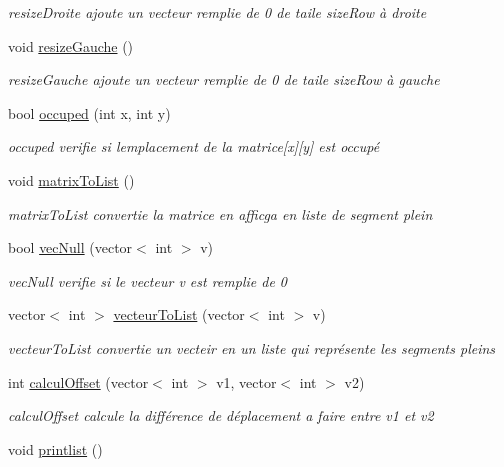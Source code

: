 \begin{DoxyCompactItemize}
\begin{DoxyCompactList}\small\item\em resize\+Droite ajoute un vecteur remplie de 0 de taile size\+Row à droite \end{DoxyCompactList}\item 
void \hyperlink{classmatrix_a20b826143f701edefd8eacb92e44c7a6}{resize\+Gauche} ()\hypertarget{classmatrix_a20b826143f701edefd8eacb92e44c7a6}{}\label{classmatrix_a20b826143f701edefd8eacb92e44c7a6}

\begin{DoxyCompactList}\small\item\em resize\+Gauche ajoute un vecteur remplie de 0 de taile size\+Row à gauche \end{DoxyCompactList}\item 
bool \hyperlink{classmatrix_ab803b319d6488ae03985740b6437222f}{occuped} (int x, int y)
\begin{DoxyCompactList}\small\item\em occuped verifie si l\textquotesingle{}emplacement de la matrice\mbox{[}x\mbox{]}\mbox{[}y\mbox{]} est occupé \end{DoxyCompactList}\item 
void \hyperlink{classmatrix_a041925ba18b2fb25d350d0f6786d8a2a}{matrix\+To\+List} ()\hypertarget{classmatrix_a041925ba18b2fb25d350d0f6786d8a2a}{}\label{classmatrix_a041925ba18b2fb25d350d0f6786d8a2a}

\begin{DoxyCompactList}\small\item\em matrix\+To\+List convertie la matrice en afficga en liste de segment plein \end{DoxyCompactList}\item 
bool \hyperlink{classmatrix_ad1222d5c3689e27c2acd88fa1100b830}{vec\+Null} (vector$<$ int $>$ v)
\begin{DoxyCompactList}\small\item\em vec\+Null verifie si le vecteur v est remplie de 0 \end{DoxyCompactList}\item 
vector$<$ int $>$ \hyperlink{classmatrix_a83ac048f17c6031c31fd67242e37edc7}{vecteur\+To\+List} (vector$<$ int $>$ v)
\begin{DoxyCompactList}\small\item\em vecteur\+To\+List convertie un vecteir en un liste qui représente les segments pleins \end{DoxyCompactList}\item 
int \hyperlink{classmatrix_aa26916f337f663161fa8d1022919d41d}{calcul\+Offset} (vector$<$ int $>$ v1, vector$<$ int $>$ v2)
\begin{DoxyCompactList}\small\item\em calcul\+Offset calcule la différence de déplacement a faire entre v1 et v2 \end{DoxyCompactList}\item 
void \hyperlink{classmatrix_a56dd8532b44f9aed61b1f3b745d05a84}{printlist} ()\hypertarget{classmatrix_a56dd8532b44f9aed61b1f3b745d05a84}{}\label{classmatrix_a56dd8532b44f9aed61b1f3b745d05a84}


\end{DoxyCompactItemize}
